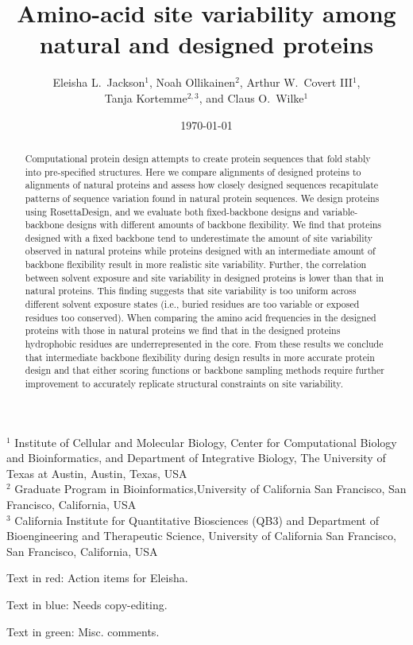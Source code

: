 \documentclass[12pt]{article}
\title{Amino-acid site variability among natural and designed proteins}
\author{Eleisha L.\ Jackson$^1$, Noah Ollikainen$^2$, Arthur W.\ Covert III$^1$,\\ Tanja Kortemme$^{2,3}$, and Claus O.\ Wilke$^1$}
\begin{document}
\date{\today}
\maketitle

\noindent
$^1$ Institute of Cellular and Molecular Biology, Center for Computational Biology and Bioinformatics, and Department of Integrative Biology, The University of Texas at Austin, Austin, Texas, USA\\
$^2$ Graduate Program in Bioinformatics,University of California San Francisco, San Francisco, California, USA\\
$^3$ California Institute for Quantitative Biosciences (QB3) and Department of Bioengineering and Therapeutic Science, University of California San Francisco, San Francisco, California, USA

\bigskip

\noindent
{\color{red}Text in red: Action items for Eleisha.}

\noindent
{\color{blue}Text in blue: Needs copy-editing.}

\noindent
{\color{green}Text in green: Misc. comments.}

\begin{abstract}
Computational protein design attempts to create protein sequences that fold stably into pre-specified structures. Here we compare alignments of designed proteins to alignments of natural proteins and assess how closely designed sequences recapitulate patterns of sequence variation found in natural protein sequences. We design proteins using RosettaDesign, and we evaluate both fixed-backbone designs and variable-backbone designs with different amounts of backbone flexibility. We find that proteins designed with a fixed backbone tend to underestimate the amount of site variability observed in natural proteins while proteins designed with an intermediate amount of backbone flexibility result in more realistic site variability. Further, the correlation between solvent exposure and site variability in designed proteins is lower than that in natural proteins. This finding suggests that site variability is too uniform across different solvent exposure states (i.e., buried residues are too variable or exposed residues too conserved). When comparing the amino acid frequencies in the designed proteins with those in natural proteins we find that in the designed proteins hydrophobic residues are underrepresented in the core. From these results we conclude that intermediate backbone flexibility during design results in more accurate protein design and that either scoring functions or backbone sampling methods require further improvement to accurately replicate structural constraints on site variability.
\end{abstract}
\end{document}
